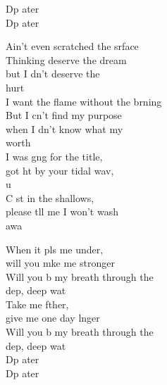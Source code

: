 \begin{cancion}
\begin{chorus}
	\jump
		Dp ater     \\
		Dp ater     \jump\\
	\end{chorus}%
	\jump
	Ain't even scratched the srface\\
	Thinking  deserve the dream \\
	but I dn't deserve the \\
	hurt \\
	I want the flame without the brning\\
	But I cn't find my purpose \\
	when I dn't know what my \\
	worth  \\
	\jump
	I was gng for the title, \\
	got ht by your tidal wav, \\
	u \\
	C st in the shallows, \\
	please tll me I won't wash\\
	 awa   \jump\\
	\begin{chorus}%
		When it pls me under, \\
		will you mke me stronger\\
		Will you b my breath through the \\
		dep, deep wat \\
		Take me fther, \\
		give me one day lnger\\
		Will you b my breath through the \\
		dep, deep wat \\
	\jump
		Dp ater     \\
		Dp ater   \jump\\
	\end{chorus}%

\end{cancion}

